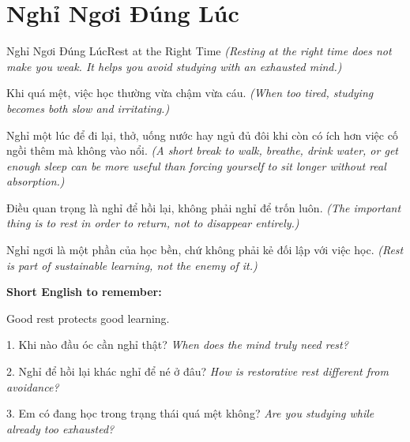 \section{Nghỉ Ngơi Đúng Lúc}
\begin{truyen}{Nghỉ Ngơi Đúng Lúc}{Rest at the Right Time}
\textit{(Resting at the right time does not make you weak. It helps you avoid studying with an exhausted mind.)}

Khi quá mệt, việc học thường vừa chậm vừa cáu.
\textit{(When too tired, studying becomes both slow and irritating.)}

Nghỉ một lúc để đi lại, thở, uống nước hay ngủ đủ đôi khi còn có ích hơn việc cố ngồi thêm mà không vào nổi.
\textit{(A short break to walk, breathe, drink water, or get enough sleep can be more useful than forcing yourself to sit longer without real absorption.)}

Điều quan trọng là nghỉ để hồi lại, không phải nghỉ để trốn luôn.
\textit{(The important thing is to rest in order to return, not to disappear entirely.)}
\end{truyen}

\begin{baihoc}
Nghỉ ngơi là một phần của học bền, chứ không phải kẻ đối lập với việc học.
\textit{(Rest is part of sustainable learning, not the enemy of it.)}
\end{baihoc}

\begin{ghinhoanh}
\textbf{Short English to remember:}

Good rest protects good learning.

\end{ghinhoanh}

\begin{tuhocnhanh}
1. Khi nào đầu óc cần nghỉ thật? \textit{When does the mind truly need rest?}

2. Nghỉ để hồi lại khác nghỉ để né ở đâu? \textit{How is restorative rest different from avoidance?}

3. Em có đang học trong trạng thái quá mệt không? \textit{Are you studying while already too exhausted?}
\end{tuhocnhanh}
\ngancach


